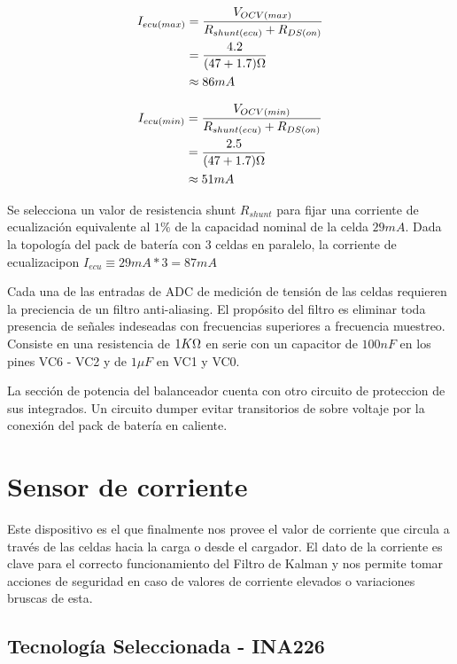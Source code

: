 \documentclass[10pt, a4paper]{report}
\begin{document}
\begin{align}
    I_{ecu (max)} &= \frac{V_{OCV(max)}}{R_{shunt(ecu)}+R_{DS (on)}}\\
    &= \frac{4.2}{(47 + 1.7)\ohm}\\
    &\approx 86mA
\end{align}

\begin{align}
    I_{ecu (min)} &= \frac{V_{OCV(min)}}{R_{shunt(ecu)}+R_{DS (on)}}\\
    &= \frac{2.5}{(47 + 1.7)\ohm}\\
    &\approx 51mA
\end{align}

Se selecciona un valor de resistencia shunt $R_{shunt}$ para fijar una corriente
de ecualización equivalente al $1\%$ de la capacidad nominal de la celda $29mA$. 
Dada la topología del pack de batería con 3 celdas en paralelo, la corriente de
ecualizacipon $I_{ecu} \equiv 29mA * 3 = 87 mA$

Cada una de las entradas de ADC de medición de tensión de las celdas requieren
la preciencia de un filtro anti-aliasing. El propósito del filtro es eliminar
toda presencia de señales indeseadas con frecuencias superiores a frecuencia
muestreo. Consiste en una resistencia de $1 K\ohm$ en serie con un capacitor de
$100 nF$ en los pines VC6 - VC2 y de $1 \mu F$ en VC1 y VC0.

La sección de potencia del balanceador cuenta con otro circuito de proteccion de
sus integrados. Un circuito dumper evitar transitorios de sobre voltaje por la
conexión del pack de batería en caliente. 

\newpage

\section{Sensor de corriente}

Este dispositivo es el que finalmente nos provee el valor de corriente que 
circula a través de las celdas hacia la carga o desde el cargador. El dato de la 
corriente es clave para el correcto funcionamiento del Filtro de Kalman y nos 
permite tomar acciones de seguridad en caso de valores de corriente elevados o 
variaciones bruscas de esta.

\subsection{Tecnología Seleccionada - INA226}\label{seq:ina226_selection}
\end{document}
